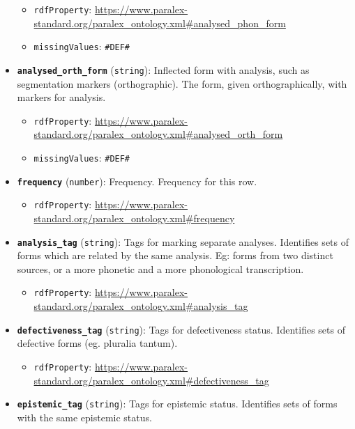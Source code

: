 \begin{itemize}
  \begin{itemize}
  \tightlist
  \item
    \texttt{rdfProperty}:
    \url{https://www.paralex-standard.org/paralex_ontology.xml\#analysed_phon_form}
  \item
    \texttt{missingValues}: \texttt{\#DEF\#}
  \end{itemize}
\item
  \textbf{\texttt{analysed\_orth\_form}} (\texttt{string}): Inflected
  form with analysis, such as segmentation markers (orthographic). The
  form, given orthographically, with markers for analysis.

  \begin{itemize}
  \tightlist
  \item
    \texttt{rdfProperty}:
    \url{https://www.paralex-standard.org/paralex_ontology.xml\#analysed_orth_form}
  \item
    \texttt{missingValues}: \texttt{\#DEF\#}
  \end{itemize}
\item
  \textbf{\texttt{frequency}} (\texttt{number}): Frequency. Frequency
  for this row.

  \begin{itemize}
  \tightlist
  \item
    \texttt{rdfProperty}:
    \url{https://www.paralex-standard.org/paralex_ontology.xml\#frequency}
  \end{itemize}
\item
  \textbf{\texttt{analysis\_tag}} (\texttt{string}): Tags for marking
  separate analyses. Identifies sets of forms which are related by the
  same analysis. Eg: forms from two distinct sources, or a more phonetic
  and a more phonological transcription.

  \begin{itemize}
  \tightlist
  \item
    \texttt{rdfProperty}:
    \url{https://www.paralex-standard.org/paralex_ontology.xml\#analysis_tag}
  \end{itemize}
\item
  \textbf{\texttt{defectiveness\_tag}} (\texttt{string}): Tags for
  defectiveness status. Identifies sets of defective forms (eg. pluralia
  tantum).

  \begin{itemize}
  \tightlist
  \item
    \texttt{rdfProperty}:
    \url{https://www.paralex-standard.org/paralex_ontology.xml\#defectiveness_tag}
  \end{itemize}
\item
  \textbf{\texttt{epistemic\_tag}} (\texttt{string}): Tags for epistemic
  status. Identifies sets of forms with the same epistemic status.


\end{itemize}
